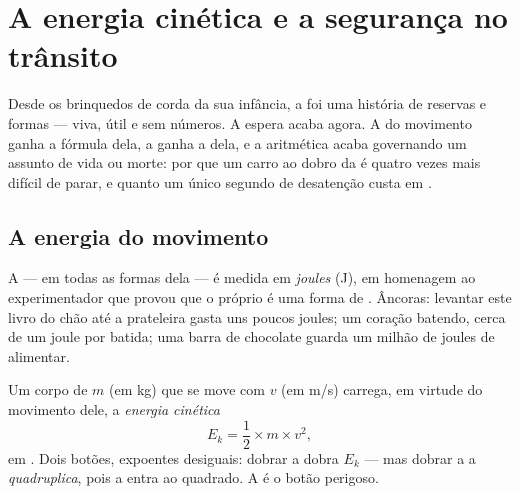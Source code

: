 \chapter{A energia cinética e a segurança no trânsito}\label{ch:g9:kinetic-energy-safety}

Desde os brinquedos de corda da sua infância, a  foi uma
história de reservas e formas --- viva, útil e sem números. A espera
acaba agora. A  do movimento ganha a fórmula dela, a 
ganha a  dela, e a aritmética acaba governando um assunto de
vida ou morte: por que um carro ao dobro da  é quatro vezes
mais difícil de parar, e quanto um único segundo de desatenção custa
em .

\section{A energia do movimento}

\begin{definition}[O joule]\label{def:g9:kinetic-energy-safety:joule}
A  --- em todas as formas dela --- é medida em
\emph{joules} (\unit{J}), em homenagem ao experimentador
que provou que o próprio  é uma forma de . Âncoras:
levantar este livro do chão até a prateleira gasta uns poucos joules;
um coração batendo, cerca de um joule por batida; uma barra de
chocolate guarda um milhão de joules de  alimentar.
\end{definition}

\begin{proposition}\label{prop:g9:kinetic-energy-safety:formula}
Um corpo de  $m$ (em \unit{kg}) que se move com  $v$
(em \unit{m/s}) carrega, em virtude do movimento dele, a
\emph{energia cinética}
\[
E_k = \frac{1}{2} \times m \times v^2 ,
\]
em . Dois botões, expoentes desiguais: dobrar a  dobra
$E_k$ --- mas dobrar a \emph{} a \emph{quadruplica}, pois a
 entra ao quadrado. A  é o botão perigoso.
\end{proposition}

